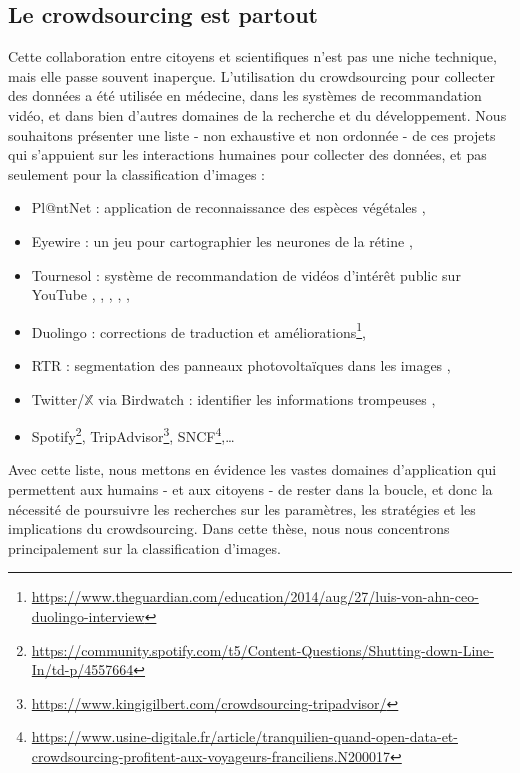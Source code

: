\subsection{Le crowdsourcing est partout}

Cette collaboration entre citoyens et scientifiques n'est pas une niche technique, mais elle passe souvent inaperçue.
L'utilisation du crowdsourcing pour collecter des données a été utilisée en médecine, dans les systèmes de recommandation vidéo, et dans bien d'autres domaines de la recherche et du développement.
Nous souhaitons présenter une liste - non exhaustive et non ordonnée - de ces projets qui s'appuient sur les interactions humaines pour collecter des données, et pas seulement pour la classification d'images :
\begin{itemize}
    \item Pl@ntNet : application de reconnaissance des espèces végétales \citep{plantet},
    \item Eyewire : un jeu pour cartographier les neurones de la rétine \citep{tinati2017investigation},
    \item Tournesol : système de recommandation de vidéos d'intérêt public sur YouTube \citep{hoang2021tournesol},
    \citep{openai2023gpt4}, \citep{openai2023gpt4}, \citep{openai2023gpt4}, \citep{openai2023gpt4},
    \item Duolingo : corrections de traduction et améliorations\footnote{\url{https://www.theguardian.com/education/2014/aug/27/luis-von-ahn-ceo-duolingo-interview}},
    \item RTR : segmentation des panneaux photovoltaïques dans les images \citep{kasmi2023crowdsourced},
    \item Twitter/$\mathbb{X}$ via Birdwatch : identifier les informations trompeuses \citep{wojcik2022birdwatch},
    \item Spotify\footnote{\url{https://community.spotify.com/t5/Content-Questions/Shutting-down-Line-In/td-p/4557664}}, TripAdvisor\footnote{\url{https://www.kingigilbert.com/crowdsourcing-tripadvisor/}}, SNCF\footnote{\url{https://www.usine-digitale.fr/article/tranquilien-quand-open-data-et-crowdsourcing-profitent-aux-voyageurs-franciliens.N200017}},\dots
\end{itemize}

Avec cette liste, nous mettons en évidence les vastes domaines d'application qui permettent aux humains - et aux citoyens - de rester dans la boucle, et donc la nécessité de poursuivre les recherches sur les paramètres, les stratégies et les implications du crowdsourcing.
Dans cette thèse, nous nous concentrons principalement sur la classification d'images.

